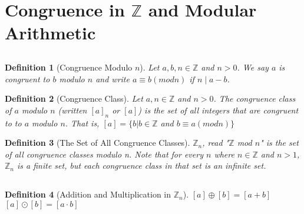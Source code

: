 \documentclass{article}
\theoremstyle{break}
\newtheorem{definition}{Definition}[subsection]
\newcommand*{\Z}{\mathbb{Z}}
\begin{document}
\section{Congruence in $\Z$ and Modular Arithmetic}
\subsection{}
\begin{definition}[Congruence Modulo $n$]
  Let $a, b, n \in \Z$ and $n > 0$. We say $a$ is congruent to $b$ modulo $n$
  and write $a \equiv b (mod n)$ if $n \mid a - b$.
\end{definition}

\begin{definition}[Congruence Class]
  Let $a, n \in \Z$ and $n > 0$. The congruence class of $a$ modulo $n$
  (written $[a]_n$ or $[a]$) is the set of all integers that are congruent to
  to $a$ modulo $n$. That is, $[a] = \{b | b \in \Z$ and $b \equiv a (mod n)\}$
\end{definition}

\begin{definition}[The Set of All Congruence Classes] 
  $\Z_n$, read "$\Z$ mod $n$" is the set of all congruence classes modulo n.
  Note that for every $n$ where $n \in \Z$ and $n > 1$, $\Z_n$ is a finite set,
  but each congruence class in that set is an infinite set. 
\end{definition}

\subsection{}
\begin{definition}[Addition and Multiplication in $\Z_n$]
  $[a] \oplus [b] = [a + b]$
  \\$[a] \odot [b] = [a \cdot b]$
\end{definition}

\end{document}
